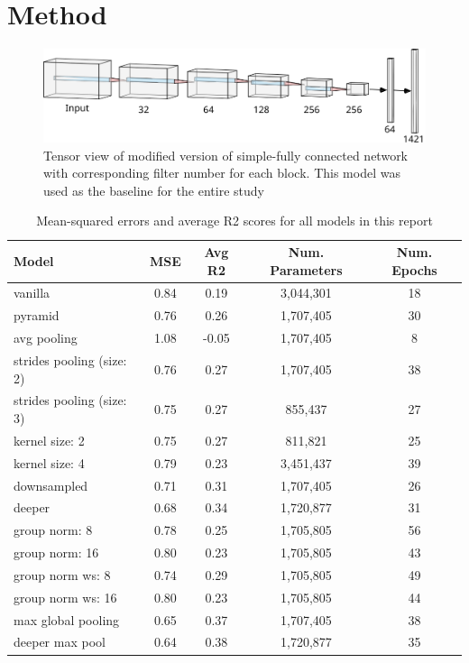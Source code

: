 \documentclass{article}
\begin{document}
    \section*{Method}
    \begin{figure}[h]
        \centering
        \includegraphics[scale=0.8]{nn}
        \centering
        \caption{
            Tensor view of modified version of simple-fully connected network with corresponding filter number for each block. This model was used as the baseline for the entire study}
        \label{fig:sfcn}
    \end{figure}
    \begin{table}[h!]
        \begin{tabular}{||l c c c c||}
            \hline
            Model & MSE & Avg R2 & Num. Parameters & Num. Epochs \\
            \hline\hline
            vanilla & 0.84 & 0.19 & 3,044,301 & 18 \\
            \hline
            pyramid & 0.76 & 0.26 & 1,707,405 & 30 \\
            \hline
            avg pooling & 1.08 & -0.05 & 1,707,405 & 8 \\
            \hline
            strides pooling (size: 2) & 0.76 & 0.27 & 1,707,405 & 38 \\
            \hline
            strides pooling (size: 3) & 0.75 & 0.27 & 855,437 & 27 \\
            \hline
            kernel size: 2 & 0.75 & 0.27 & 811,821 & 25 \\
            \hline
            kernel size: 4 & 0.79 & 0.23 & 3,451,437 & 39 \\
            \hline
            downsampled & 0.71 & 0.31 & 1,707,405 & 26 \\
            \hline
            deeper & 0.68 & 0.34 & 1,720,877 & 31 \\
            \hline
            group norm: 8 & 0.78 & 0.25 & 1,705,805 & 56 \\
            \hline
            group norm: 16 & 0.80 & 0.23 & 1,705,805 & 43 \\
            \hline
            group norm ws: 8 & 0.74 & 0.29 & 1,705,805 & 49 \\
            \hline
            group norm ws: 16 & 0.80 & 0.23 & 1,705,805 & 44 \\ 
            \hline
            max global pooling & 0.65 & 0.37 & 1,707,405 & 38 \\
            \hline
            deeper max pool & 0.64 & 0.38 & 1,720,877 & 35 \\
            \hline
        \end{tabular}
        \caption{Mean-squared errors and average R2 scores for all models in this report}
        \label{table:1}
    \end{table}
\end{document}
